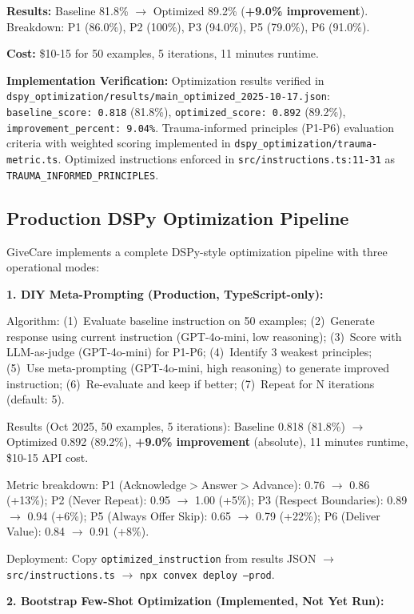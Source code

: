 \documentclass{article}
\begin{document}
\textbf{Results:} Baseline 81.8\% $\rightarrow$ Optimized 89.2\% (\textbf{+9.0\% improvement}). Breakdown: P1 (86.0\%), P2 (100\%), P3 (94.0\%), P5 (79.0\%), P6 (91.0\%).

\textbf{Cost:} \$10-15 for 50 examples, 5 iterations, 11 minutes runtime.

\textbf{Implementation Verification:} Optimization results verified in \texttt{dspy\_optimization/results/main\_optimized\_2025-10-17.json}: \texttt{baseline\_score: 0.818} (81.8\%), \texttt{optimized\_score: 0.892} (89.2\%), \texttt{improvement\_percent: 9.04\%}. Trauma-informed principles (P1-P6) evaluation criteria with weighted scoring implemented in \texttt{dspy\_optimization/trauma-metric.ts}. Optimized instructions enforced in \texttt{src/instructions.ts:11-31} as \texttt{TRAUMA\_INFORMED\_PRINCIPLES}.

%
\subsection{Production DSPy Optimization Pipeline}%
\label{subsec:ProductionDSPyOptimizationPipeline}%
GiveCare implements a complete DSPy-style optimization pipeline with three operational modes:

\textbf{1. DIY Meta-Prompting (Production, TypeScript-only):}

Algorithm: (1)~Evaluate baseline instruction on 50 examples; (2)~Generate response using current instruction (GPT-4o-mini, low reasoning); (3)~Score with LLM-as-judge (GPT-4o-mini) for P1-P6; (4)~Identify 3 weakest principles; (5)~Use meta-prompting (GPT-4o-mini, high reasoning) to generate improved instruction; (6)~Re-evaluate and keep if better; (7)~Repeat for N iterations (default: 5).

Results (Oct 2025, 50 examples, 5 iterations): Baseline 0.818 (81.8\%) $\rightarrow$ Optimized 0.892 (89.2\%), \textbf{+9.0\% improvement} (absolute), 11 minutes runtime, \$10-15 API cost.

Metric breakdown: P1 (Acknowledge$>$Answer$>$Advance): 0.76 $\rightarrow$ 0.86 (+13\%); P2 (Never Repeat): 0.95 $\rightarrow$ 1.00 (+5\%); P3 (Respect Boundaries): 0.89 $\rightarrow$ 0.94 (+6\%); P5 (Always Offer Skip): 0.65 $\rightarrow$ 0.79 (+22\%); P6 (Deliver Value): 0.84 $\rightarrow$ 0.91 (+8\%).

Deployment: Copy \texttt{optimized\_instruction} from results JSON $\rightarrow$ \texttt{src/instructions.ts} $\rightarrow$ \texttt{npx convex deploy --prod}.

\textbf{2. Bootstrap Few-Shot Optimization (Implemented, Not Yet Run):}
\end{document}
